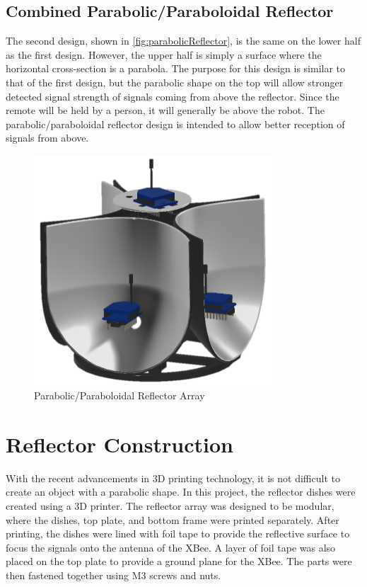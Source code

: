 \subsection{Combined Parabolic/Paraboloidal Reflector}
The second design, shown in \autoref{fig:parabolicReflector}, is the same on the lower half as the first design. However, the upper half is simply a surface where the horizontal cross-section is a parabola. The purpose for this design is similar to that of the first design, but the parabolic shape on the top will allow stronger detected signal strength of signals coming from above the reflector. Since the remote will be held by a person, it will generally be above the robot. The parabolic/paraboloidal reflector design is intended to allow better reception of signals from above.
\begin{figure}
    \centering
    \includegraphics[width=3.5in]{figs/img/parabolicReflector.png}
    \caption{Parabolic/Paraboloidal Reflector Array}
    \label{fig:parabolicReflector}
\end{figure}

\section{Reflector Construction}
With the recent advancements in 3D printing technology, it is not difficult to create an object with a parabolic shape. In this project, the reflector dishes were created using a 3D printer. The reflector array was designed to be modular, where the dishes, top plate, and bottom frame were printed separately. After printing, the dishes were lined with foil tape to provide the reflective surface to focus the signals onto the antenna of the XBee. A layer of foil tape was also placed on the top plate to provide a ground plane for the XBee. The parts were then fastened together using M3 screws and nuts.


